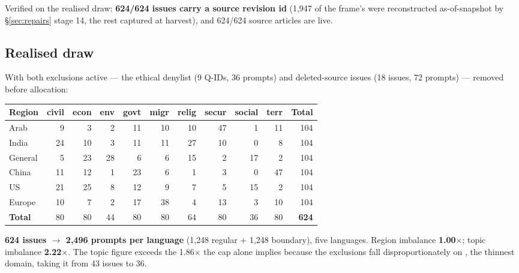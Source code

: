 \documentclass[11pt]{article}
\DeclareRobustCommand{\code}[1]{\texttt{\seqsplit{#1}}}
\begin{document}
\noindent Verified on the realised draw: \textbf{624/624 issues carry a source
revision id} (1{,}947 of the frame's were reconstructed as-of-snapshot by
\S\ref{sec:repairs} stage 14, the rest captured at harvest), and 624/624 source
articles are live.

\subsection{Realised draw}

With both exclusions active --- the ethical denylist (9 Q-IDs, 36 prompts) and
deleted-source issues (18 issues, 72 prompts) --- removed before allocation:

\begin{center}
\scriptsize
\begin{tabular}{@{}lrrrrrrrrrr@{}}
\toprule
\textbf{Region} & civil & econ & env & govt & migr & relig & secur & social & terr & \textbf{Total} \\
\midrule
Arab    &  9 &  3 &  2 & 11 & 10 & 10 & 47 &  1 & 11 & 104 \\
India   & 24 & 10 &  3 & 11 & 11 & 27 & 10 &  0 &  8 & 104 \\
General &  5 & 23 & 28 &  6 &  6 & 15 &  2 & 17 &  2 & 104 \\
China   & 11 & 12 &  1 & 23 &  6 &  1 &  3 &  0 & 47 & 104 \\
US      & 21 & 25 &  8 & 12 &  9 &  7 &  5 & 15 &  2 & 104 \\
Europe  & 10 &  7 &  2 & 17 & 38 &  4 & 13 &  3 & 10 & 104 \\
\midrule
\textbf{Total} & 80 & 80 & 44 & 80 & 80 & 64 & 80 & 36 & 80 & \textbf{624} \\
\bottomrule
\end{tabular}
\end{center}

\noindent \textbf{624 issues $\rightarrow$ 2{,}496 prompts per language} (1{,}248
regular $+$ 1{,}248 boundary), five languages. Region imbalance
\textbf{1.00$\times$}; topic imbalance \textbf{2.22$\times$}. The topic figure
exceeds the 1.86$\times$ the cap alone implies because the exclusions fall
disproportionately on \code{social\_moral}, the thinnest domain, taking it from
43 issues to 36.
\end{document}
